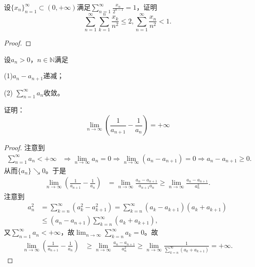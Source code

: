\documentclass[../../main.tex]{subfiles}%
\begin{document}
\begin{example}
设$\{x_n\}_{n = 1}^{\infty} \subset (0,+\infty)$满足$\sum_{n = 1}^{\infty} \frac{x_n}{2^{n - 1}} = 1$，证明
\[
\sum_{n = 1}^{\infty} \sum_{k = 1}^n \frac{x_k}{n^2} \leqslant 2, \sum_{n = 1}^{\infty} \frac{x_n}{n^2} < 1.
\]
\end{example}
\begin{proof}

\end{proof}

\begin{example}
设$a_n > 0$，$n \in \mathbb{N}$满足

(1)$a_n - a_{n + 1}$递减；

(2) $\sum_{n = 1}^{\infty} a_n$收敛。

证明：
\[
\lim_{n \to \infty} \left( \frac{1}{a_{n + 1}} - \frac{1}{a_n} \right) = +\infty
\]
\end{example}
\begin{proof}
注意到
\begin{align*}
\sum_{n=1}^{\infty}{a_n}<+\infty &\Longrightarrow \lim_{n\rightarrow \infty}a_n=0\Longrightarrow \lim_{n\rightarrow \infty}\left( a_n-a_{n+1} \right) =0\Longrightarrow a_n-a_{n+1}\geqslant 0.
\end{align*}
从而$\{ a_n \} \searrow 0$。于是
\begin{align*}
\lim_{n\rightarrow \infty}\left( \frac{1}{a_{n+1}}-\frac{1}{a_n} \right) &=\lim_{n\rightarrow \infty}\frac{a_n-a_{n+1}}{a_{n+1}a_n}\geqslant \lim_{n\rightarrow \infty}\frac{a_n-a_{n+1}}{a_{n}^{2}}.
\end{align*}
注意到
\begin{align*}
a_{n}^{2}&=\sum_{k=n}^{\infty}{\left( a_{k}^{2}-a_{k+1}^{2} \right)}=\sum_{k=n}^{\infty}{\left( a_k-a_{k+1} \right) \left( a_k+a_{k+1} \right)} \\
&\leqslant \left( a_n-a_{n+1} \right) \sum_{k=n}^{\infty}{\left( a_k+a_{k+1} \right)},
\end{align*}
又$\sum_{n=1}^{\infty}{a_n}<+\infty$，故$\lim_{n\rightarrow \infty}\sum_{k=n}^{\infty}{a_k}=0$。故
\begin{align*}
\lim_{n\rightarrow \infty}\left( \frac{1}{a_{n+1}}-\frac{1}{a_n} \right) &\geqslant \lim_{n\rightarrow \infty}\frac{a_n-a_{n+1}}{a_{n}^{2}}\geqslant \lim_{n\rightarrow \infty}\frac{1}{\sum\limits_{k=n}^{\infty}{\left( a_k+a_{k+1} \right)}}=+\infty .
\end{align*}
\end{proof}
\end{document}
